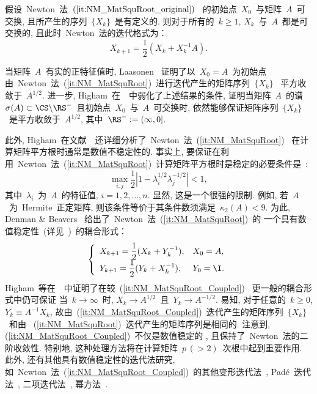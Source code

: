 \begin{lemma}
假设~Newton~法~$(\ref{it:NM_MatSquRoot_original})$~
的初始点~$X_0$~与矩阵~$A$~可交换,
且所产生的序列~$\{X_k\}$~是有定义的. 则对于所有的~$k\geq1$,
$X_k$~与~$A$~都是可交换的,  且此时~Newton~法的迭代格式为：
\begin{equation}
\label{it:NM_MatSquRoot} X_{k+1} = \frac{1}{2}(X_k+X_k^{-1}A).
\end{equation}
\end{lemma}

当矩阵~$A$~有实的正特征值时, Laasonen
\cite{Laasonen1958}~证明了以~$X_0 =
A$~为初始点由~Newton~法~(\ref{it:NM_MatSquRoot})~进行迭代产生的矩阵序列~$\{X_k\}$~
平方收敛于~$A^{1/2}$. 进一步,
Higham~在~\cite{Higham1986}~中弱化了上述结果的条件,
证明当矩阵~$A$~的谱~$\sigma(A) \subset
\CS\backslash\RS^-$~且初始点~$X_0$~与~$A$~可交换时,
依然能够保证矩阵序列~$\{X_k\}$~是平方收敛于~$A^{1/2}$, 其中~$\RS^-
:= (\infty,0]$.

此外,
Higham~在文献~\cite{Higham1986}~还详细分析了~Newton~法~(\ref{it:NM_MatSquRoot})~
在计算矩阵平方根时通常是数值不稳定性的. 事实上,
要保证在利用~Newton~法~(\ref{it:NM_MatSquRoot})~计算矩阵平方根时是稳定的必要条件是~\cite{Higham1986}:
$$
\max_{i,j}\frac{1}{2}\left|1-\lambda_i^{1/2}\lambda_j^{-1/2}\right|
< 1,
$$
其中~$\lambda_i$~为~$A$~的特征值, $i = 1,2,\ldots, n$. 显然,
这是一个很强的限制. 例如, 若~$A$~为~Hermite~正定矩阵,
则该条件等价于其条件数须满足~$\kappa_2(A) < 9$. 为此, Denman $\&$
Beavers
\cite{Denman1976}~给出了~Newton~法~(\ref{it:NM_MatSquRoot})~的
一个具有数值稳定性~(详见~\cite[6.4~节]{Higham2008})~的耦合形式：
\begin{equation}
\label{it:NM_MatSquRoot_Coupled} \left\{
\begin{array}{ll}
\displaystyle X_{k + 1} = \frac{1}{2}(X_k + Y_k^{-1}), & X_0 =
A, \\
\displaystyle Y_{k + 1} = \frac{1}{2}(Y_k + X_k^{-1}), & Y_0 = \I.
\end{array} \right.
\end{equation}
Higham~等在~\cite[定理~4.5]{Higham2005}~中证明了在较~(\ref{it:NM_MatSquRoot_Coupled})~
更一般的耦合形式中仍可保证 当~$k \to \infty$~时, $X_k \to
A^{1/2}$~且~$Y_k \to A^{-1/2}$. 易知, 对于任意的~$k\geq 0$, $Y_k
\equiv A^{-1}X_k$,
故由~(\ref{it:NM_MatSquRoot_Coupled})~迭代产生的矩阵序列~$\{X_k\}$~和由
~(\ref{it:NM_MatSquRoot})~迭代产生的矩阵序列是相同的. 注意到,
(\ref{it:NM_MatSquRoot_Coupled})~不仅是数值稳定的 ,
且保持了~Newton~法的二阶收敛性. 特别地,
这种处理方法将在计算矩阵~$p\, (> 2)$~次根中起到重要作用. 此外,
还有其他具有数值稳定性的迭代法研究,
如~Newton~法~(\ref{it:NM_MatSquRoot_Coupled})~的其他变形迭代法~\cite{Cheng2001,Iannazzo2003,Meini2004},
Pad\'{e}~迭代法~\cite{Higham1997,Lu1998,Higham2005},
二项迭代法~\cite{Alefeld1982,Butler1985,LinLiu2001},
幂方法~\cite{Hasan1997}.





